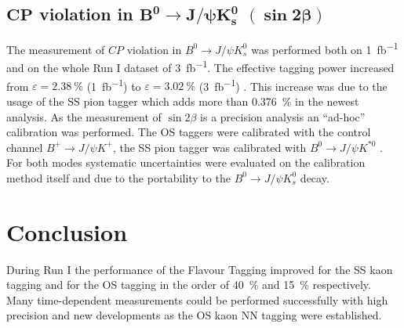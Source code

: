 \documentclass{PoS}
\begin{document}
\subsection{$\bm{C\!P}$ violation in $\bm{B^0}\bm{\to} \bm{J\!/\!\psi K_s^0}$ $\pmb{(\sin 2\beta)}$}

The measurement of $C\!P$ violation in $B^0\to J\!/\!\psi K_s^0$ was performed both on \SI{1}{fb^{-1}} and on the whole Run I dataset of \SI{3}{fb^{-1}}. The effective tagging power increased from $\varepsilon=\SI{2.38}{\%}$ (\SI{1}{fb^{-1}}) \cite{9} to $\varepsilon=\SI{3.02}{\%}$ (\SI{3}{fb^{-1}}) \cite{10}. This increase was due to the usage of the SS pion tagger which adds more than \SI{0.376}{\%} in the newest analysis. As the measurement of $\sin 2\beta$ is a precision analysis an \enquote{ad-hoc} calibration was performed. The OS taggers were calibrated with the control channel $B^+\to J\!/\!\psi K^+$, the SS pion tagger was calibrated with $B^0\to J\!/\!\psi K^{*0}$ . For both modes systematic uncertainties were evaluated on the calibration method itself and due to the portability to the \mbox{$B^0\to J\!/\!\psi K_s^0$} decay. 

%



\section{Conclusion}\label{sec:conclusion}

During Run I the performance of the Flavour Tagging improved for the SS kaon tagging and for the OS tagging in the order of \SI{40}{\%} and \SI{15}{\%} respectively. Many time-dependent measurements could be performed successfully with high precision and new developments as the OS kaon NN tagging were established. 
\end{document}
